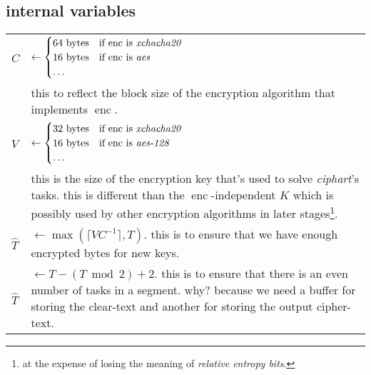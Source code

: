 \documentclass[twocolumn]{article}
\DeclareMathOperator{\enc}{enc}
\DeclareMathOperator{\maxf}{max}
\begin{document}
\subsection{internal variables}
\begin{tabularx}{\columnwidth}{lX}
    $C$         & $\gets \begin{cases}
                        64 \text{ bytes} & \text{if $\enc$ is
                                            \emph{xchacha20}}\\
                        16 \text{ bytes} & \text{if $\enc$ is \emph{aes}}\\
                        \ldots & \\
                     \end{cases}$\\
                & this to reflect the block size of the encryption
                    algorithm that implements $\enc$.\\
    $V$ & $\gets \begin{cases}
                        32 \text{ bytes} & \text{if $\enc$ is
                                            \emph{xchacha20}}\\
                        16 \text{ bytes} & \text{if $\enc$ is
                            \emph{aes-128}}\\
                        \ldots & \\
                     \end{cases}$\\
                & this is the size of the encryption key that's used to
                    solve \emph{ciphart}'s tasks.  this is different than
                    the $\enc$-independent $K$ which is
                    possibly used by other encryption algorithms in later
                    stages\footnote{at the expense of losing the meaning of
                    \emph{relative entropy bits}.}.\\
    $\hat T$    & $\gets \maxf(\lceil V C^{-1}\rceil, T)$.  this
                    is to ensure that we have enough encrypted bytes for
                    new keys.\\
    $\hat T$    & $\gets T - (T \bmod 2) + 2$.  this is to ensure that
                    there is an even number of tasks in a segment.  why?
                    because we need a buffer for storing the clear-text and
                    another for storing the output cipher-text.\\
\end{tabularx}
\end{document}
